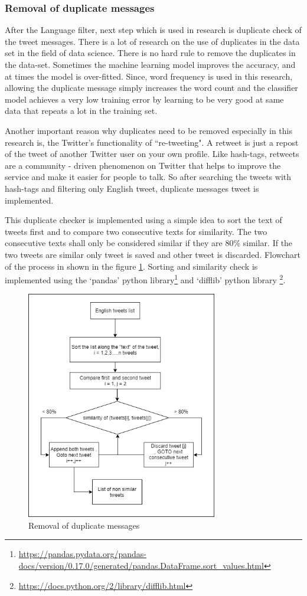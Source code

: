 \subsubsection{Removal of duplicate messages}
After the Language filter, next step which is used in research is duplicate check of the tweet messages. There is a lot of research on the use of duplicates in the data set in the field of data science. There is no hard rule to remove the duplicates in the data-set. Sometimes the machine learning model improves the accuracy, and at times  the model is over-fitted. Since, word frequency is used in this research, allowing the duplicate message simply increases the word count and the classifier model
achieves a very low training error by learning to be very good at same data that repeats a lot in the training set.

Another important reason why duplicates need to be removed especially in this research is, the Twitter's functionality of ``re-tweeting". A retweet is just a repost of the tweet of another Twitter user on your own profile. Like hash-tags, retweets are a community - driven phenomenon on Twitter that helps to improve the service and make it easier for people to talk. So after searching the tweets with hash-tags and filtering only English tweet, duplicate messages tweet is implemented.

This duplicate checker is implemented using a simple idea to sort the text of tweets first and to compare two consecutive texts for similarity. The two consecutive texts shall only be considered similar if they are 80\% similar. If the two tweets are similar only tweet is saved and other tweet is discarded. Flowchart of the process in shown in the figure \ref{fig:duplicatechk}. Sorting and similarity check is implemented using the `pandas' python library\footnote{\url{https://pandas.pydata.org/pandas-docs/version/0.17.0/generated/pandas.DataFrame.sort_values.html}} and `difflib' python library \footnote{\url{https://docs.python.org/2/library/difflib.html}}.

\begin{figure}
	\centering
	\includegraphics[width=10cm\linewidth,height=10cm]{thesis_template/images/duplicatecheck.png}
	\caption{Removal of duplicate messages}
	\label{fig:duplicatechk}
\end{figure}

